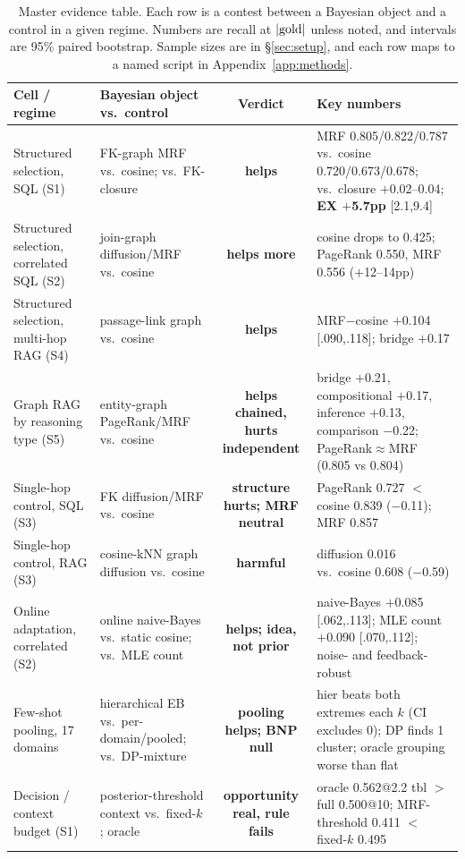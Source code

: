 \documentclass[11pt]{article}
\begin{document}
\begin{table}[t]
\centering\small
\caption{Master evidence table. Each row is a contest between a Bayesian object and a control in a given
regime. Numbers are recall at $|{\rm gold}|$ unless noted, and intervals are 95\% paired bootstrap.
Sample sizes are in \S\ref{sec:setup}, and each row maps to a named script in
Appendix~\ref{app:methods}.}
\label{tab:master}
\begin{tabular}{@{}p{3.4cm}p{3.2cm}cp{4.6cm}@{}}
\toprule
\textbf{Cell / regime} & \textbf{Bayesian object vs.\ control} & \textbf{Verdict} & \textbf{Key numbers}\\
\midrule
Structured selection, SQL (S1) & FK-graph MRF vs.\ cosine; vs.\ FK-closure & \textbf{helps} & MRF 0.805/0.822/0.787 vs.\ cosine 0.720/0.673/0.678; vs.\ closure $+$0.02--0.04; \textbf{EX $+$5.7pp} [2.1,9.4]\\
Structured selection, correlated SQL (S2) & join-graph diffusion/MRF vs.\ cosine & \textbf{helps more} & cosine drops to 0.425; PageRank 0.550, MRF 0.556 ($+$12--14pp)\\
Structured selection, multi-hop RAG (S4) & passage-link graph vs.\ cosine & \textbf{helps} & MRF$-$cosine $+$0.104 [.090,.118]; bridge $+$0.17\\
Graph RAG by reasoning type (S5) & entity-graph PageRank/MRF vs.\ cosine & \textbf{helps chained, hurts independent} & bridge $+$0.21, compositional $+$0.17, inference $+$0.13, comparison $-$0.22; PageRank$\approx$MRF (0.805 vs 0.804)\\
Single-hop control, SQL (S3) & FK diffusion/MRF vs.\ cosine & \textbf{structure hurts; MRF neutral} & PageRank 0.727 $<$ cosine 0.839 ($-$0.11); MRF 0.857\\
Single-hop control, RAG (S3) & cosine-kNN graph diffusion vs.\ cosine & \textbf{harmful} & diffusion 0.016 vs.\ cosine 0.608 ($-$0.59)\\
\midrule
Online adaptation, correlated (S2) & online naive-Bayes vs.\ static cosine; vs.\ MLE count & \textbf{helps; idea, not prior} & naive-Bayes $+$0.085 [.062,.113]; MLE count $+$0.090 [.070,.112]; noise- and feedback-robust\\
Few-shot pooling, 17 domains & hierarchical EB vs.\ per-domain/pooled; vs.\ DP-mixture & \textbf{pooling helps; BNP null} & hier beats both extremes each $k$ (CI excludes 0); DP finds 1 cluster; oracle grouping worse than flat\\
\midrule
Decision / context budget (S1) & posterior-threshold context vs.\ fixed-$k$; oracle & \textbf{opportunity real, rule fails} & oracle 0.562@2.2 tbl $>$ full 0.500@10; MRF-threshold 0.411 $<$ fixed-$k$ 0.495\\

\end{tabular}
\end{table}
\end{document}
